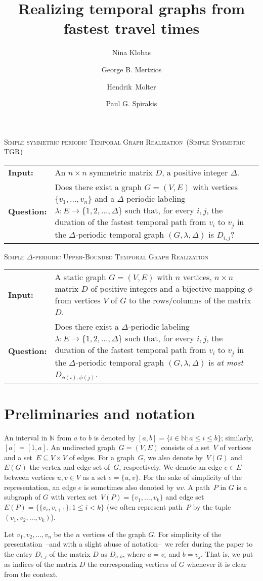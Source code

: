 \documentclass[a4paper,UKenglish,cleveref, autoref, thm-restate]{lipics-v2021}
\title{Realizing temporal graphs from fastest travel times} %
\author{Nina Klobas}{Department of Computer Science, Durham University, UK}{nina.klobas@durham.ac.uk}{ https://orcid.org/0000-0002-8024-5782}{}
\author{George B. Mertzios}{Department of Computer Science, Durham University, UK}{george.mertzios@durham.ac.uk}{https://orcid.org/0000-0001-7182-585X}{Supported by the EPSRC grant EP/P020372/1.}
\author{Hendrik~Molter}{Department of Computer Science, Ben-Gurion~University~of~the~Negev, 
	Beer-Sheva, 
	Israel}{molterh@post.bgu.ac.il}{https://orcid.org/0000-0002-4590-798X}{Supported by the ISF, grant No.~1456/18, and the ERC, grant number 949707.}
\author{Paul G. Spirakis}{Department of Computer Science, University of Liverpool, UK}{p.spirakis@liverpool.ac.uk}{https://orcid.org/0000-0001-5396-3749}{Supported by the EPSRC grant EP/P02002X/1.}
\makeatletter
\newcommand{\problemdef}[3]{
	\begin{center}
		\begin{minipage}{0.95\textwidth}
			\noindent
			#1
			\vspace{5pt}\\
			\setlength{\tabcolsep}{3pt}
			\begin{tabularx}{\textwidth}{@{}lX@{}}
				\textbf{Input:}& #2 \\
				\textbf{Question:}& #3
			\end{tabularx}
		\end{minipage}
	\end{center}
}
\newcommand{\deltaSymExactLong}{\textsc{Simple symmetric periodic Temporal Graph Realization}}
\newcommand{\deltaSymExact}{\textsc{Simple Symmetric TGR}}
\newcommand{\DeltaUpperBoundLong}{\textsc{Simple $\Delta$-periodic Upper-Bounded Temporal Graph Realization}}
\makeatother
\begin{document}
	\maketitle
	
\problemdef{\deltaSymExactLong\ (\deltaSymExact)}
{An $n \times n$ symmetric matrix $D$, a positive integer $\Delta$.}
{Does there exist a graph $G=(V,E)$ with vertices $\{v_1,\ldots,v_{n}\}$ 
	and a $\Delta$-periodic labeling $\lambda: E \rightarrow \{1,2,\ldots,\Delta\}$ such that, 
	for every $i,j$, the duration of the fastest temporal path from $v_i$ to $v_j$ in the $\Delta$-periodic temporal graph $(G,\lambda,\Delta)$ is $D_{i,j}$?}
	
\problemdef{\DeltaUpperBoundLong}
{A static graph $G=(V,E)$ with $n$ vertices, $n \times n$ matrix $D$ of positive integers and a bijective mapping $\phi$ from vertices $V$ of $G$ to the rows/columns of the matrix $D$.}
{Does there exist a $\Delta$-periodic labeling $\lambda: E \rightarrow \{1,2,\ldots,\Delta\}$ such that, 
	for every $i,j$, the duration of the fastest temporal path from $v_i$ to $v_j$ in the $\Delta$-periodic temporal graph $(G,\lambda,\Delta)$ is \emph{at most} $D_{\phi(i),\phi(j)}$.}

\section{Preliminaries and notation}

An interval in $\mathbb N$ from $a$ to $b$ is denoted by $[a,b] = \{ i\in \mathbb N  :  a \leq i \leq b\}$; similarly, $[a] = [1,a]$.
An undirected graph~$G=(V,E)$ consists of a set~$V$ of vertices 
and a set~$E \subseteq V \times V$ of edges.
For a graph~$G$, we also denote by~$V(G)$ and~$E(G)$ the vertex and edge set of~$G$, respectively.
We denote an edge $e \in E$ between vertices $u,v \in V$ as a set $e=\{u,v\}$.
For the sake of simplicity of the representation, an edge $e$ is sometimes also denoted by $uv$. 
A path~$P$ in $G$ is a subgraph of $G$ with vertex set~$V(P)=\{v_1,\dots,v_k\}$ and edge set~$E(P)=\{\{v_i,v_{i+1}\} :  1\leq i<k\}$
(we often represent path~$P$ by the tuple~$(v_1,v_2,\dots,v_k)$).

Let $v_1,v_2,\ldots,v_n$ be the $n$ vertices of the graph $G$. 
For simplicity of the presentation~--and with a slight abuse of notation--~we refer during the paper to the entry $D_{i,j}$ of the matrix $D$ as 
$D_{a,b}$, where $a=v_i$ and $b=v_j$. That is, we put as indices of the matrix $D$ the corresponding vertices of $G$ whenever it is clear from the context.
\end{document}
